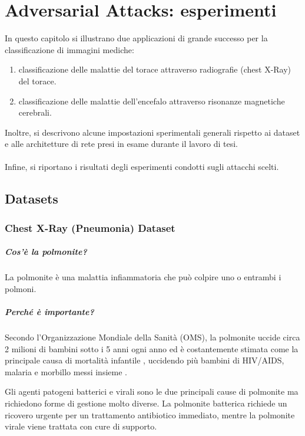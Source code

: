\chapter{Adversarial Attacks: esperimenti}
\label{chap:4}

In questo capitolo si illustrano due applicazioni di grande successo per la classificazione di immagini mediche:
\begin{enumerate}
    \item classificazione delle malattie del torace attraverso radiografie (chest X-Ray) del torace.
    \item classificazione delle malattie dell'encefalo attraverso risonanze magnetiche cerebrali.
\end{enumerate}
Inoltre, si descrivono alcune impostazioni sperimentali generali rispetto ai dataset e alle architetture di rete presi in esame durante il lavoro di tesi. \\\\
Infine, si riportano i risultati degli esperimenti condotti sugli attacchi scelti. 
\newpage

\section{Datasets}

    \subsection{Chest X-Ray (Pneumonia) Dataset}
    
        \paragraph{Cos'è la polmonite?}
        La polmonite è una malattia infiammatoria che può colpire uno o entrambi i polmoni.
        
        \paragraph{Perché è importante?} 
        Secondo l'Organizzazione Mondiale della Sanità (OMS), la polmonite uccide circa 2 milioni di bambini sotto i 5 anni ogni anno ed è costantemente stimata come la principale causa di mortalità infantile \cite{rudan2008epidemiology}, uccidendo più bambini di HIV/AIDS, malaria e morbillo messi insieme \cite{adegbola2012childhood}.
        
        Gli agenti patogeni batterici e virali sono le due principali cause di polmonite ma richiedono forme di gestione molto diverse.
        La polmonite batterica richiede un ricovero urgente per un trattamento antibiotico immediato, mentre la polmonite virale viene trattata con cure di supporto.
        
